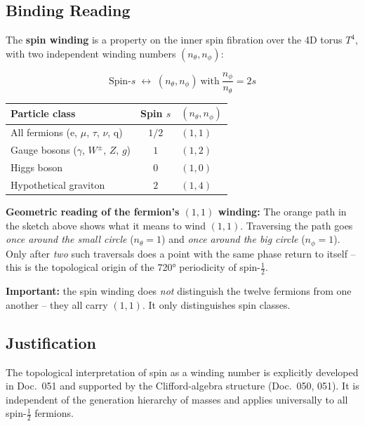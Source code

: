 \subsection*{Binding Reading}

The \textbf{spin winding} is a property on the inner spin fibration
over the 4D torus $T^4$, with two independent winding numbers
$(n_\theta, n_\phi)$:

\begin{equation}
  \text{Spin-}s \;\longleftrightarrow\;
  (n_\theta, n_\phi)\ \text{with}\ \frac{n_\phi}{n_\theta} = 2s
  \tag{210.2}
\end{equation}

\begin{center}
{\footnotesize
\begin{tabular}{lcl}
\toprule
\textbf{Particle class} & \textbf{Spin $s$} & \textbf{$(n_\theta, n_\phi)$} \\
\midrule
All fermions (e, $\mu$, $\tau$, $\nu$, q) & $1/2$ & $(1,1)$ \\
Gauge bosons ($\gamma$, $W^\pm$, $Z$, $g$) & $1$  & $(1,2)$ \\
Higgs boson                                 & $0$  & $(1,0)$ \\
Hypothetical graviton                       & $2$  & $(1,4)$ \\
\bottomrule
\end{tabular}
}
\end{center}

\textbf{Geometric reading of the fermion's $(1,1)$ winding:}
The orange path in the sketch above shows what it means to wind
$(1,1)$. Traversing the path goes \emph{once around the small circle}
($n_\theta = 1$) and \emph{once around the big circle} ($n_\phi = 1$).
Only after \emph{two} such traversals does a point with the same
phase return to itself -- this is the topological origin of the 720°
periodicity of spin-$\tfrac12$.

\textbf{Important:} the spin winding does \emph{not} distinguish the
twelve fermions from one another -- they all carry $(1,1)$. It only
distinguishes spin classes.

\subsection*{Justification}

The topological interpretation of spin as a winding number is
explicitly developed in Doc.~051 and supported by the Clifford-algebra
structure (Doc.~050, 051). It is independent of the generation
hierarchy of masses and applies universally to all
spin-$\tfrac12$ fermions.

